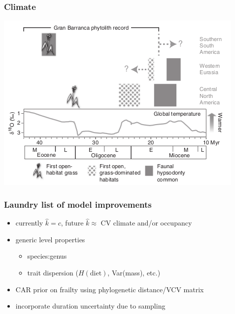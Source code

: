 \documentclass{beamer}
\begin{document}
\begin{frame}
  \frametitle{Climate}

  \includegraphics[height=0.8\textheight,width=\textwidth,keepaspectratio=true]{figure/stromberg}

  \tiny{}
\end{frame}

\begin{frame}
  \frametitle{Laundry list of model improvements}

  \begin{itemize}
    \item currently \(\hat{k} = c\), future \(\hat{k} \approx\) CV climate and/or occupancy
    \item generic level properties 
      \begin{itemize}
        \item species:genus
        \item trait dispersion (\(H(\text{diet})\), Var(mass), etc.)
      \end{itemize}
    \item CAR prior on frailty using phylogenetic distance/VCV matrix
    \item incorporate duration uncertainty due to sampling 
  \end{itemize}

\end{frame}
\end{document}
